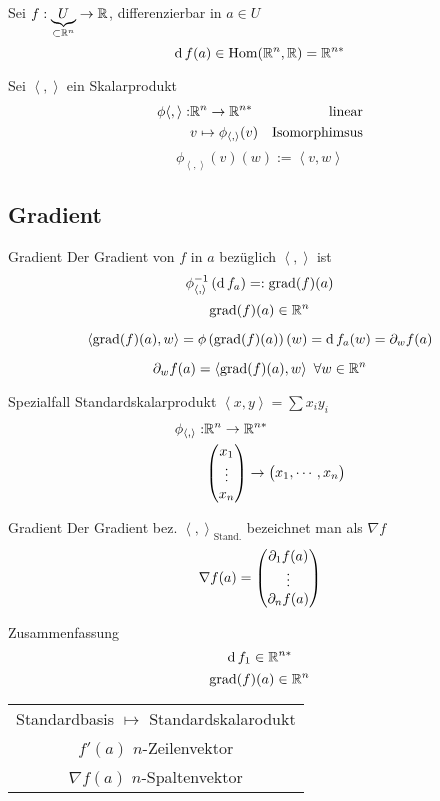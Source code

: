\begin{Bem}
  Sei $f:\underbrace{U}_{\subset\mathbb{R}^n}\to \mathbb{R}$, differenzierbar in $a\in U$
  \[\operatorname{d} f(a)\in\operatorname{Hom}(\mathbb{R}^n,\mathbb{R})=\mathbb{R}^{n*}\]
\end{Bem}
\begin{Bem}
  Sei $\left\langle , \right\rangle$ ein Skalarprodukt
  \begin{align*}
    \phi{\left\langle , \right\rangle}:&\mathbb{R}^n\to\mathbb{R}^{n*}&\text{linear}\\
    &v\mapsto\phi_{\left\langle , \right\rangle}(v)&\text{Isomorphimsus}
  \end{align*}
  \[\phi_{\left\langle , \right\rangle}(v)(w):=\left\langle v,w \right\rangle \]
\end{Bem}
\subsection{Gradient}
\begin{Def}{Gradient}
  Der Gradient von $f$ in $a$ bezüglich $\left\langle , \right\rangle$ ist
  \[\phi_{\left\langle , \right\rangle}^{-1}\left( \operatorname{d} f_a \right)=:\operatorname{grad}(f)(a)\]
  \[\operatorname{grad}(f)(a)\in\mathbb{R}^n\]
\end{Def}
\begin{Bem}
  \[\left\langle \operatorname{grad}(f)(a),w \right\rangle =\phi\left( \operatorname{grad}(f)(a) \right)(w)=\operatorname{d} f_a(w)=\partial_wf(a)\]
\end{Bem}
\begin{Bem}
  \[\partial_wf(a)=\left\langle \operatorname{grad}(f)(a),w \right\rangle \ \forall w\in\mathbb{R}^n\]
\end{Bem}
\begin{Bem}{Spezialfall Standardskalarprodukt}
  $\left\langle x,y \right\rangle =\sum x_iy_i$
  \begin{align*}
    \phi_{\left\langle , \right\rangle}:&\mathbb{R}^n\to\mathbb{R}^{n*}\\
    &\begin{pmatrix}x_1\\\vdots\\x_n\end{pmatrix}\to\begin{pmatrix}x_1,\cdots,x_n\end{pmatrix}
  \end{align*}
\end{Bem}
\begin{Not}{Gradient}
  Der Gradient bez. $\left\langle , \right\rangle_\text{Stand.}$ bezeichnet man als $\nabla f$
  \[\nabla f(a)=\begin{pmatrix}\partial_1 f(a)\\\vdots\\\partial_n f(a)\end{pmatrix}\]
\end{Not}
\begin{Bem}{Zusammenfassung}
  \[\operatorname{d} f_1\in\mathbb{R}^{n*}\]
  \[\operatorname{grad}(f)(a)\in\mathbb{R}^n\]
  \begin{tabular}[htb]{c}
  Standardbasis $\mapsto$ Standardskalarodukt\\
  $f'(a)$ $n$-Zeilenvektor\\
  $\nabla f(a)$ $n$-Spaltenvektor
  \end{tabular}
\end{Bem}
